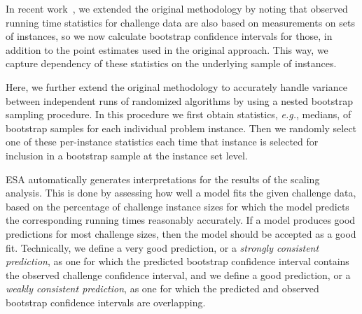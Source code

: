 \documentclass[aic]{iosart2x}
\newcommand{\eg}{\emph{e.g.}}
\begin{document}
In recent work~\cite{MuHoo15}, we extended the original methodology by noting that observed running time statistics for challenge data are also based on measurements on sets of instances, so we now calculate bootstrap confidence intervals for those, in addition to the point estimates used in the original approach. This way, we capture dependency of these statistics on the underlying sample of instances.

Here, we further extend the original methodology to accurately handle variance between independent runs of randomized algorithms by using a nested bootstrap sampling procedure. In this procedure we first obtain statistics, \eg{}, medians, of bootstrap samples for each individual problem instance. Then we randomly select one of these per-instance statistics each time that instance is selected for inclusion in a bootstrap sample at the instance set level. 


\label{sec:auto-interpretation}

ESA automatically generates interpretations for the results of the scaling analysis. This is done by assessing how well a model fits the given challenge data, based on the percentage of challenge instance sizes for which the model predicts the corresponding running times reasonably accurately. If a model produces good predictions for most challenge sizes, then the model should be accepted as a good fit. Technically, we define a very good prediction, or a \emph{strongly consistent prediction}, as one for which the predicted bootstrap confidence interval contains the observed challenge confidence interval, and we define a good prediction, or a \emph{weakly consistent prediction}, as one for which the predicted and observed bootstrap confidence intervals are overlapping.
\end{document}
